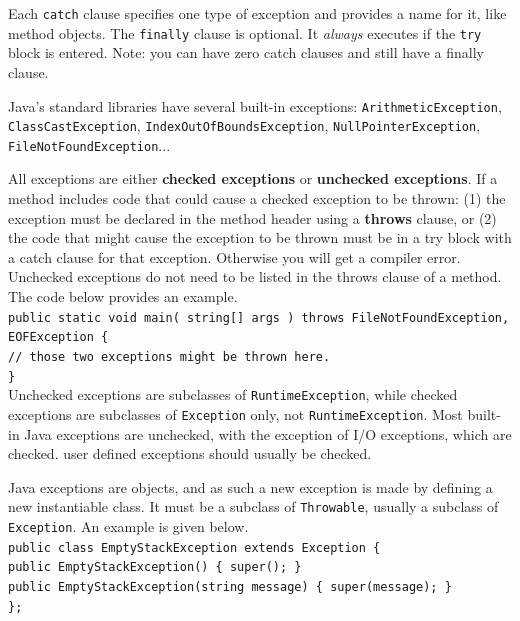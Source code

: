 Each \texttt{catch} clause specifies one type of exception and provides a name for it, like method objects. The \texttt{finally} clause is optional. It \textit{always} executes if the \texttt{try} block is entered. Note: you can have zero catch clauses and still have a finally clause. 

Java's standard libraries have several built-in exceptions: \texttt{ArithmeticException}, \texttt{ClassCastException}, \texttt{IndexOutOfBoundsException}, \texttt{NullPointerException}, \texttt{FileNotFoundException}...

All exceptions are either \textbf{checked exceptions} or \textbf{unchecked exceptions}. If a method includes code that could cause a checked exception to be thrown: (1) the exception must be declared in the method header using a \textbf{throws} clause, or (2) the code that might cause the exception to be thrown must be in a try block with a catch clause for that exception. Otherwise you will get a compiler error. Unchecked exceptions do not need to be listed in the throws clause of a method. The code below provides an example. \\

\texttt{public static void main( string[] args ) throws FileNotFoundException, EOFException \{} \\
\indent \indent \texttt{// those two exceptions might be thrown here.} \\
\indent \texttt{\}} \\

Unchecked exceptions are subclasses of \texttt{RuntimeException}, while checked exceptions are subclasses of \texttt{Exception} only, not \texttt{RuntimeException}. Most built-in Java exceptions are unchecked, with the exception of I/O exceptions, which are checked. user defined exceptions should usually be checked. 

Java exceptions are objects, and as such a new exception is made by defining a new instantiable class. It must be a subclass of \texttt{Throwable}, usually a subclass of \texttt{Exception}. An example is given below. \\

\texttt{public class EmptyStackException extends Exception \{} \\
\indent \indent \texttt{public EmptyStackException() \{ super(); \}} \\
\indent \indent \texttt{public EmptyStackException(string message) \{ super(message); \}} \\
\indent \texttt{\};} \\


